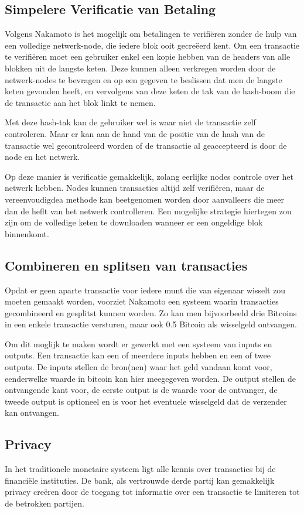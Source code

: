 	\subsection{Simpelere Verificatie van Betaling}
	Volgens Nakamoto is het mogelijk om betalingen te verifiëren zonder de hulp van een volledige netwerk-node, die iedere blok ooit gecreëerd kent. Om een transactie te verifiëren moet een gebruiker enkel een kopie hebben van de headers van alle blokken uit de langste keten. Deze kunnen alleen verkregen worden door de netwerk-nodes te bevragen en op een gegeven te beslissen dat men de langste keten gevonden heeft, en vervolgens van deze keten de tak van de hash-boom die de transactie aan het blok linkt te nemen. 
	
	Met deze hash-tak kan de gebruiker wel is waar niet de transactie zelf controleren. Maar er kan aan de hand van de positie van de hash van de transactie wel gecontroleerd worden of de transactie al geaccepteerd is door de node en het netwerk.
	
	Op deze manier is verificatie gemakkelijk, zolang eerlijke nodes controle over het netwerk hebben. Nodes kunnen transacties altijd zelf verifiëren, maar de vereenvoudigdea methode kan beetgenomen worden door aanvalleers die meer dan de heflt van het netwerk controlleren. Een mogelijke strategie hiertegen zou zijn om de volledige keten te downloaden wanneer er een ongeldige blok binnenkomt. 
	\subsection{Combineren en splitsen van transacties}
	Opdat er geen aparte transactie voor iedere munt die van eigenaar wisselt zou moeten gemaakt worden, voorziet Nakamoto een systeem waarin transacties gecombineerd en gesplitst kunnen worden. Zo kan men bijvoorbeeld drie Bitcoins in een enkele transactie versturen, maar ook 0.5 Bitcoin als wisselgeld ontvangen.
	
	Om dit moglijk te maken wordt er gewerkt met een systeem van inputs en outputs. Een transactie kan een of meerdere inputs hebben en een of twee outputs. De inputs stellen de bron(nen) waar het geld vandaan komt voor, eenderwelke waarde in bitcoin kan hier meegegeven worden. De output stellen de ontvangende kant voor, de eerste output is de waarde voor de ontvanger, de tweede output is optioneel en is voor het eventuele wisselgeld dat de verzender kan ontvangen.
	\subsection{Privacy}
	In het traditionele monetaire systeem ligt alle kennis over transacties bij de financiële instituties. De bank, als vertrouwde derde partij kan gemakkelijk privacy creëren door de toegang tot informatie over een transactie te limiteren tot de betrokken partijen. 
	
